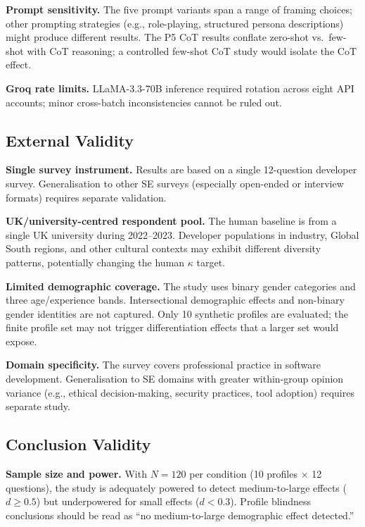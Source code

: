 \documentclass[12pt,a4paper]{article}
\begin{document}
\textbf{Prompt sensitivity.}
The five prompt variants span a range of framing choices; other
prompting strategies (e.g., role-playing, structured persona descriptions)
might produce different results.
The P5 CoT results conflate zero-shot vs.\ few-shot with CoT reasoning;
a controlled few-shot CoT study would isolate the CoT effect.

\textbf{Groq rate limits.}
LLaMA-3.3-70B inference required rotation across eight API accounts;
minor cross-batch inconsistencies cannot be ruled out.

\subsection{External Validity}
\label{sec:threats:external}

\textbf{Single survey instrument.}
Results are based on a single 12-question developer survey.
Generalisation to other SE surveys (especially open-ended or interview
formats) requires separate validation.

\textbf{UK/university-centred respondent pool.}
The human baseline is from a single UK university during 2022--2023.
Developer populations in industry, Global South regions, and other
cultural contexts may exhibit different diversity patterns,
potentially changing the human $\kappa$ target.

\textbf{Limited demographic coverage.}
The study uses binary gender categories and three age/experience bands.
Intersectional demographic effects and non-binary gender identities are
not captured.
Only 10 synthetic profiles are evaluated; the finite profile set may
not trigger differentiation effects that a larger set would expose.

\textbf{Domain specificity.}
The survey covers professional practice in software development.
Generalisation to SE domains with greater within-group opinion variance
(e.g., ethical decision-making, security practices, tool adoption)
requires separate study.

\subsection{Conclusion Validity}
\label{sec:threats:conclusion}

\textbf{Sample size and power.}
With $N{=}120$ per condition (10 profiles $\times$ 12 questions),
the study is adequately powered to detect medium-to-large effects
($d \geq 0.5$) but underpowered for small effects ($d < 0.3$).
Profile blindness conclusions should be read as ``no medium-to-large
demographic effect detected.''
\end{document}
